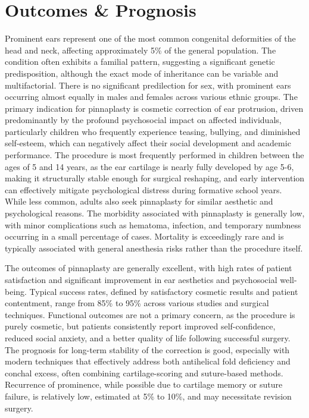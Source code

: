 \section*{Outcomes \& Prognosis}
Prominent ears represent one of the most common congenital deformities of the head and neck, affecting approximately 5\% of the general population. The condition often exhibits a familial pattern, suggesting a significant genetic predisposition, although the exact mode of inheritance can be variable and multifactorial. There is no significant predilection for sex, with prominent ears occurring almost equally in males and females across various ethnic groups. The primary indication for pinnaplasty is cosmetic correction of ear protrusion, driven predominantly by the profound psychosocial impact on affected individuals, particularly children who frequently experience teasing, bullying, and diminished self-esteem, which can negatively affect their social development and academic performance. The procedure is most frequently performed in children between the ages of 5 and 14 years, as the ear cartilage is nearly fully developed by age 5-6, making it structurally stable enough for surgical reshaping, and early intervention can effectively mitigate psychological distress during formative school years. While less common, adults also seek pinnaplasty for similar aesthetic and psychological reasons. The morbidity associated with pinnaplasty is generally low, with minor complications such as hematoma, infection, and temporary numbness occurring in a small percentage of cases. Mortality is exceedingly rare and is typically associated with general anesthesia risks rather than the procedure itself.

The outcomes of pinnaplasty are generally excellent, with high rates of patient satisfaction and significant improvement in ear aesthetics and psychosocial well-being. Typical success rates, defined by satisfactory cosmetic results and patient contentment, range from 85\% to 95\% across various studies and surgical techniques. Functional outcomes are not a primary concern, as the procedure is purely cosmetic, but patients consistently report improved self-confidence, reduced social anxiety, and a better quality of life following successful surgery. The prognosis for long-term stability of the correction is good, especially with modern techniques that effectively address both antihelical fold deficiency and conchal excess, often combining cartilage-scoring and suture-based methods. Recurrence of prominence, while possible due to cartilage memory or suture failure, is relatively low, estimated at 5\% to 10\%, and may necessitate revision surgery.


